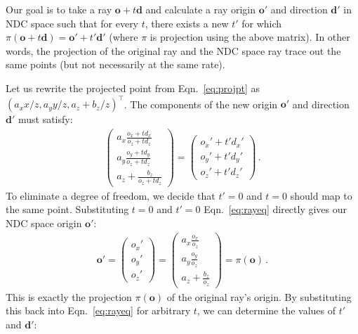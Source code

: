 Our goal is to take a ray $\mathbf o + t \mathbf d$ and calculate a ray origin $\mathbf o'$ and direction $\mathbf d'$ in NDC space such that for every $t$, there exists a new $t'$ for which $\pi(\mathbf o + t \mathbf d) = \mathbf o' + t' \mathbf d'$ (where $\pi$ is projection using the above matrix). In other words, the projection of the original ray and the NDC space ray trace out the same points (but not necessarily at the same rate). 

Let us rewrite the projected point from Eqn.~\ref{eq:projpt} as $(a_x x/z, a_y y/z, a_z + b_z / z)^\top$. The components of the new origin $\mathbf o'$ and direction $\mathbf d'$ must satisfy:
\begin{align}
    \begin{pmatrix}
        a_x \frac{o_x + t d_x}{o_z + t d_z} \\[6pt]
        a_y \frac{o_y + t d_y}{o_z + t d_z} \\[6pt]
        a_z + \frac{b_z}{o_z + t d_z}
    \end{pmatrix}
    =
    \begin{pmatrix}
        o_x' + t' d_x' \\
        o_y' + t' d_y' \\
        o_z' + t' d_z' 
    \end{pmatrix} \, .
    \label{eq:rayeq}
\end{align}
To eliminate a degree of freedom, we decide that $t'=0$ and $t=0$ should map to the same point. Substituting $t=0$ and $t'=0$ Eqn.~\ref{eq:rayeq} directly gives our NDC space origin $\mathbf o'$:
\begin{align}
    \mathbf o' =
    \begin{pmatrix}
        o_x' \\
        o_y' \\
        o_z'
    \end{pmatrix}
    =
    \begin{pmatrix}
        a_x \frac{o_x}{o_z} \\[6pt]
        a_y \frac{o_y}{o_z} \\[6pt]
        a_z + \frac{b_z}{o_z}
    \end{pmatrix}
    = \pi(\mathbf o) \,. 
\end{align}
This is exactly the projection $\pi(\mathbf o)$ of the original ray's origin. By substituting this back into Eqn.~\ref{eq:rayeq} for arbitrary $t$, we can determine the values of $t'$ and $\mathbf d'$:
